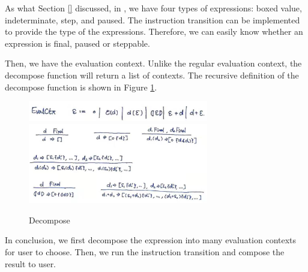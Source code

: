 As what Section \ref{} discussed, in \Hazel, we have four types of expressions: boxed value, indeterminate, step, and paused. The instruction transition can be implemented to provide the type of the expressions. Therefore, we can easily know whether an expression is final, paused or steppable.

Then, we have the evaluation context. Unlike the regular evaluation context, the decompose function will return a list of contexts. The recursive definition of the decompose function is shown in Figure \ref{fig:decompose}.

\begin{figure}[htbp]
  \centering
  \includegraphics[width=0.7\textwidth]{context.png}
  \includegraphics[width=0.7\textwidth]{decompose.png}
  \caption{Decompose}
  \label{fig:decompose}
\end{figure}


In conclusion, we first decompose the expression into many evaluation contexts for user to choose. Then, we run the instruction transition and compose the result to user. 
